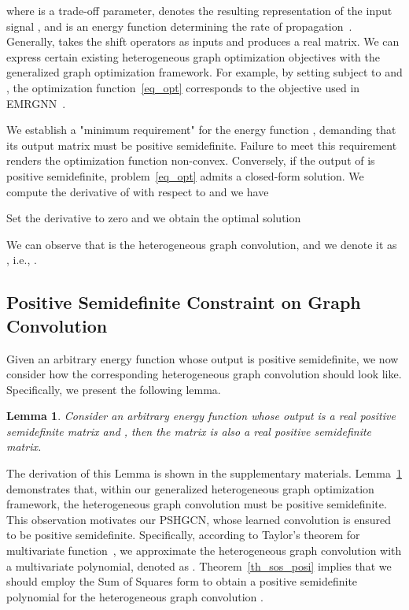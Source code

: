 \documentclass{article}
\newtheorem{lemma}{Lemma}[section]
\begin{document}
where  is a trade-off parameter,  denotes the resulting representation of the input signal , and  is an energy function determining the rate of propagation~\cite{spielman2019spectral}. Generally,  takes the shift operators  as inputs and produces a real  matrix. We can express certain existing heterogeneous graph optimization objectives with the generalized graph optimization framework. For example, by setting  subject to  and , the optimization function~\eqref{eq_opt} corresponds to the objective used in EMRGNN~\cite{emrgnn}.



We establish a "minimum requirement" for the energy function , demanding that its output matrix must be positive semidefinite. Failure to meet this requirement renders the optimization function  non-convex. Conversely, if the output of  is positive semidefinite, problem~\eqref{eq_opt} admits a closed-form solution. We compute the derivative of  with respect to  and we have

Set the derivative to zero and we obtain the optimal solution

We can observe that  is the heterogeneous graph convolution, and we denote it as , i.e., .

\subsection{Positive Semidefinite Constraint on Graph Convolution}
Given an arbitrary energy function  whose output is positive semidefinite, we now consider how the corresponding heterogeneous graph convolution  should look like. Specifically, we present the following lemma.
\begin{lemma}
\label{lemma}
Consider an arbitrary energy function  whose output is a real positive semidefinite  matrix and , then the matrix  is also a real positive semidefinite  matrix.
\end{lemma}

The derivation of this Lemma is shown in the supplementary materials. Lemma~\ref{lemma} demonstrates that, within our generalized heterogeneous graph optimization framework, the heterogeneous graph convolution  must be positive semidefinite. This observation motivates our PSHGCN, whose learned convolution is ensured to be positive semidefinite. Specifically, according to Taylor's theorem for multivariate function~\cite{taylor_mul_fun}, we approximate the heterogeneous graph convolution  with a multivariate polynomial, denoted as . Theorem~\ref{th_sos_posi} implies that we should employ the Sum of Squares form to obtain a positive semidefinite polynomial for the heterogeneous graph convolution .
\end{document}
